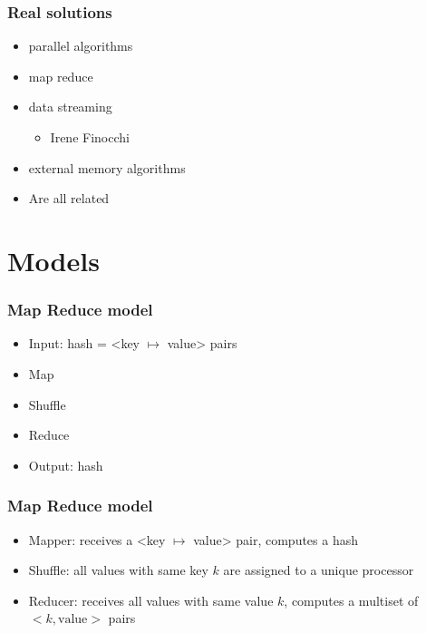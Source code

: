 \documentclass[12pt,aspectratio=169]{beamer}
\begin{document}
\begin{frame}\frametitle{Real solutions}
  \begin{itemize}
  \item
    parallel algorithms
  \item
    map reduce
  \item
    data streaming
    \begin{itemize}
    \item
      Irene Finocchi
    \end{itemize}
  \item
    external memory algorithms
  \item
      Are all related
  \end{itemize}
\end{frame}


\section{Models}

\begin{frame}\frametitle{Map Reduce model}
  \begin{itemize}
  \item
    \alert{Input}: hash = <key $\mapsto$ value> pairs
  \item
    Map
  \item
    Shuffle
  \item
    Reduce
  \item
    \alert{Output}: hash
  \end{itemize}
\end{frame}

\begin{frame}\frametitle{Map Reduce model}
  \begin{itemize}
  \item
    Mapper: receives
    \alert{a} <key $\mapsto$ value> \alert{pair}, computes a hash
  \item
    Shuffle: \alert{all} values with \alert{same key} $k$ are assigned to a
    unique processor 
  \item
    Reducer: receives \alert{all} values with \alert{same value} $k$, computes
      a \alert{multiset} of     $<k,\text{value}>$ pairs 
  \end{itemize}
\end{frame}
\end{document}
